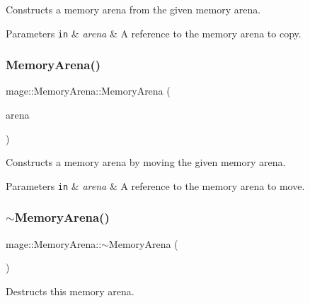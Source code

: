 Constructs a memory arena from the given memory arena.


\begin{DoxyParams}[1]{Parameters}
\mbox{\tt in}  & {\em arena} & A reference to the memory arena to copy. \\
\hline
\end{DoxyParams}
\hypertarget{classmage_1_1_memory_arena_a55394fdcf83f260fec0af55e0b3a4a53}{}\label{classmage_1_1_memory_arena_a55394fdcf83f260fec0af55e0b3a4a53} 
\subsubsection{\texorpdfstring{Memory\+Arena()}{MemoryArena()}\hspace{0.1cm}{\footnotesize\ttfamily [3/3]}}
{\footnotesize\ttfamily mage\+::\+Memory\+Arena\+::\+Memory\+Arena (\begin{DoxyParamCaption}\item[{\hyperlink{classmage_1_1_memory_arena}{Memory\+Arena} \&\&}]{arena }\end{DoxyParamCaption})\hspace{0.3cm}{\ttfamily [default]}}

Constructs a memory arena by moving the given memory arena.


\begin{DoxyParams}[1]{Parameters}
\mbox{\tt in}  & {\em arena} & A reference to the memory arena to move. \\
\hline
\end{DoxyParams}
\hypertarget{classmage_1_1_memory_arena_acfee6fc205e2eaf6aeef4acf19948e6e}{}\label{classmage_1_1_memory_arena_acfee6fc205e2eaf6aeef4acf19948e6e} 
\subsubsection{\texorpdfstring{$\sim$\+Memory\+Arena()}{~MemoryArena()}}
{\footnotesize\ttfamily mage\+::\+Memory\+Arena\+::$\sim$\+Memory\+Arena (\begin{DoxyParamCaption}{ }\end{DoxyParamCaption})}

Destructs this memory arena. 

